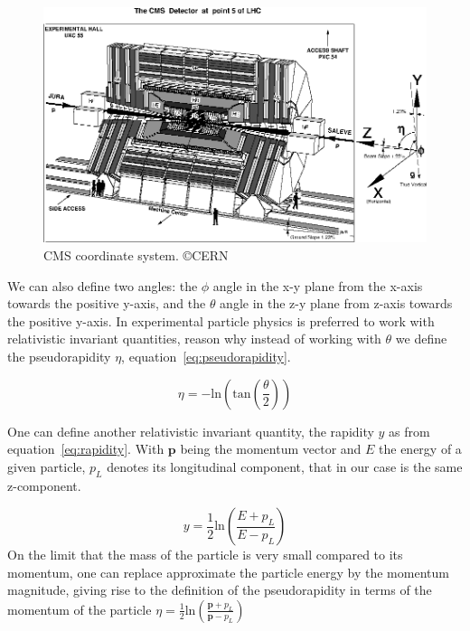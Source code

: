 \begin{figure}[!Hhtbp]
  \begin{center}
    \includegraphics[width=\textwidth]{figs/CMS_coordinates.jpg}
    \caption{CMS coordinate system. \copyright CERN}
    \label{fig:cmscoor}
  \end{center}
\end{figure}

We can also define two angles: the $\phi$ angle in the x-y plane from the x-axis towards the positive y-axis, and the $\theta$ angle in the z-y plane from z-axis towards the positive y-axis. In experimental particle physics is preferred to work with relativistic invariant quantities, reason why instead of working with $\theta$ we define the pseudorapidity $\eta$, equation~\ref{eq:pseudorapidity}. 

\begin{equation}
  \label{eq:pseudorapidity}
  \eta = -\text{ln}\left( \text{tan}\left(\frac{\theta}{2}\right)\right)
\end{equation} 

One can define another relativistic invariant quantity, the rapidity $y$ as from equation~\ref{eq:rapidity}. With $\bm{p}$ being the momentum vector and $E$ the energy of a given particle, $p_{L}$ denotes its longitudinal component, that in our case is the same z-component. 

\begin{equation}
  \label{eq:rapidity}
  y=\frac{1}{2}\text{ln}\left(\frac{E+p_{L}}{E-p_{L}}\right)
\end{equation}On the limit that the mass of the particle is very small compared to its momentum, one can replace approximate the particle energy by the momentum magnitude, giving rise to the definition of the pseudorapidity in terms of the momentum of the particle $\eta = \frac{1}{2}\text{ln}\left(\frac{\bm{p}+p_{L}}{\bm{p}-p_{L}}\right)$

